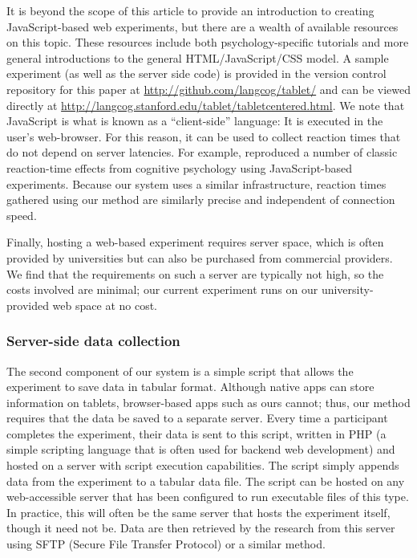 \documentclass[man,noapacite]{apa2}
\begin{document}
It is beyond the scope of this article to provide an introduction to creating JavaScript-based web experiments, but there are a wealth of available resources on this topic. These resources include both psychology-specific tutorials and more general introductions to the general HTML/JavaScript/CSS model. A sample experiment (as well as the server side code) is provided in the version control repository for this paper  at \url{http://github.com/langcog/tablet/} and can be viewed directly at \url{http://langcog.stanford.edu/tablet/tabletcentered.html}. We note that JavaScript is what is known as a ``client-side'' language: It is executed in the user's web-browser. For this reason, it can be used to collect reaction times that do not depend on server latencies. For example,  reproduced a number of classic reaction-time effects from cognitive psychology using JavaScript-based experiments. Because our system uses a similar infrastructure, reaction times gathered using our method are similarly precise and independent of connection speed. 

Finally, hosting a web-based experiment requires server space, which is often provided by universities but can also be purchased from commercial providers. We find that the requirements on such a server are typically not high, so the costs involved are minimal; our current experiment runs on our university-provided web space at no cost.


\subsubsection{Server-side data collection}

The second component of our system is a simple script that allows the experiment to save data in tabular format. Although native apps can store information on tablets, browser-based apps such as ours cannot; thus, our method requires that the data be saved to a separate server. Every time a participant completes the experiment, their data is sent to this script, written in PHP (a simple scripting language that is often used for backend web development) and hosted on a server with script execution capabilities. The script simply appends data from the experiment to a tabular data file. The script can be hosted on any web-accessible server that has been configured to run executable files of this type. In practice, this will often be the same server that hosts the experiment itself, though it need not be. Data are then retrieved by the research from this server using SFTP (Secure File Transfer Protocol) or a similar method. 
\end{document}

